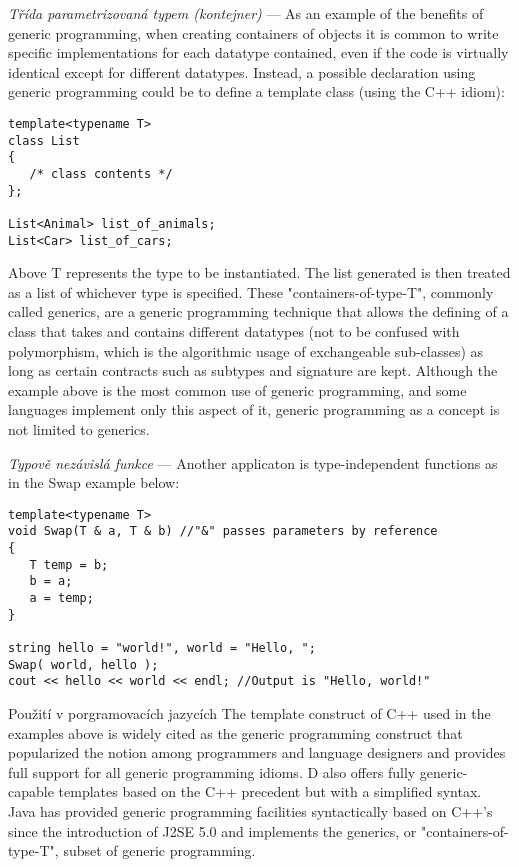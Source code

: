 \begin{priklad}
\emph{Třída parametrizovaná typem (kontejner)} ---
As an example of the benefits of generic programming, when creating containers of objects it is common to write specific implementations for each datatype contained, even if the code is virtually identical except for different datatypes. Instead, a possible declaration using generic programming could be to define a template class (using the C++ idiom):
\begin{verbatim}
template<typename T> 
class List 
{ 
   /* class contents */ 
};

List<Animal> list_of_animals;
List<Car> list_of_cars;
\end{verbatim}
Above T represents the type to be instantiated. The list generated is then treated as a list of whichever type is specified. These "containers-of-type-T", commonly called generics, are a generic programming technique that allows the defining of a class that takes and contains different datatypes (not to be confused with polymorphism, which is the algorithmic usage of exchangeable sub-classes) as long as certain contracts such as subtypes and signature are kept. Although the example above is the most common use of generic programming, and some languages implement only this aspect of it, generic programming as a concept is not limited to generics. 
\end{priklad}

\begin{priklad}
\emph{Typově nezávislá funkce} ---
Another applicaton is type-independent functions as in the Swap example below:
\begin{verbatim}
template<typename T>
void Swap(T & a, T & b) //"&" passes parameters by reference
{
   T temp = b;
   b = a;
   a = temp;
}

string hello = "world!", world = "Hello, ";
Swap( world, hello );
cout << hello << world << endl; //Output is "Hello, world!"
\end{verbatim}
\end{priklad}

\begin{obecne}{Použití v porgramovacích jazycích}
The template construct of C++ used in the examples above is widely cited as the generic programming construct that popularized the notion among programmers and language designers and provides full support for all generic programming idioms. D also offers fully generic-capable templates based on the C++ precedent but with a simplified syntax. Java has provided generic programming facilities syntactically based on C++'s since the introduction of J2SE 5.0 and implements the generics, or "containers-of-type-T", subset of generic programming.
\end{obecne}


